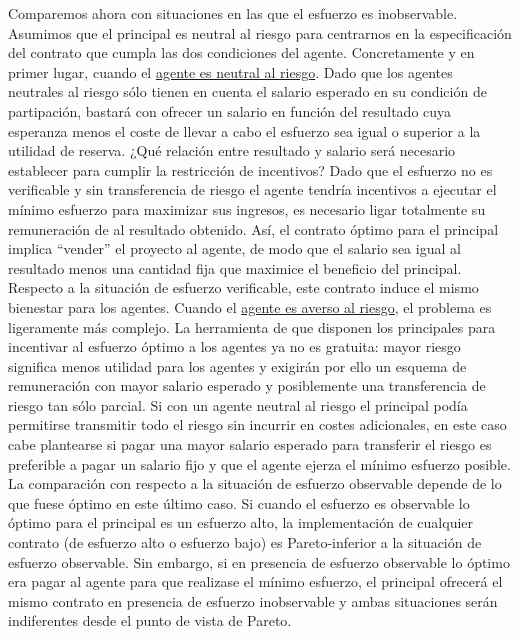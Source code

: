 \documentclass{nuevotema}
\begin{document}
Comparemos ahora con situaciones en las que el esfuerzo es inobservable. Asumimos que el principal es neutral al riesgo para centrarnos en la especificación del contrato que cumpla las dos condiciones del agente. Concretamente y en primer lugar, cuando el \underline{agente es neutral al riesgo}. Dado que los agentes neutrales al riesgo sólo tienen en cuenta el salario esperado en su condición de partipación, bastará con ofrecer un salario en función del resultado cuya esperanza menos el coste de llevar a cabo el esfuerzo sea igual o superior a la utilidad de reserva. ¿Qué relación entre resultado y salario será necesario establecer para cumplir la restricción de incentivos? Dado que el esfuerzo no es verificable y sin transferencia de riesgo el agente tendría incentivos a ejecutar el mínimo esfuerzo para maximizar sus ingresos, es necesario ligar totalmente su remuneración de al resultado obtenido. Así, el contrato óptimo para el principal implica ``vender'' el proyecto al agente, de modo que el salario sea igual al resultado menos una cantidad fija que maximice el beneficio del principal. Respecto a la situación de esfuerzo verificable, este contrato induce el mismo bienestar para los agentes. Cuando el \underline{agente es averso al riesgo}, el problema es ligeramente más complejo. La herramienta de que disponen los principales para incentivar al esfuerzo óptimo a los agentes ya no es gratuita: mayor riesgo significa menos utilidad para los agentes y exigirán por ello un esquema de remuneración con mayor salario esperado y posiblemente una transferencia de riesgo tan sólo parcial. Si con un agente neutral al riesgo el principal podía permitirse transmitir todo el riesgo sin incurrir en costes adicionales, en este caso cabe plantearse si pagar una mayor salario esperado para transferir el riesgo es preferible a pagar un salario fijo y que el agente ejerza el mínimo esfuerzo posible. La comparación con respecto a la situación de esfuerzo observable depende de lo que fuese óptimo en este último caso. Si cuando el esfuerzo es observable lo óptimo para el principal es un esfuerzo alto, la implementación de cualquier contrato (de esfuerzo alto o esfuerzo bajo) es Pareto-inferior a la situación de esfuerzo observable. Sin embargo, si en presencia de esfuerzo observable lo óptimo era pagar al agente para que realizase el mínimo esfuerzo, el principal ofrecerá el mismo contrato en presencia de esfuerzo inobservable y ambas situaciones serán indiferentes desde el punto de vista de Pareto. 
\end{document}
